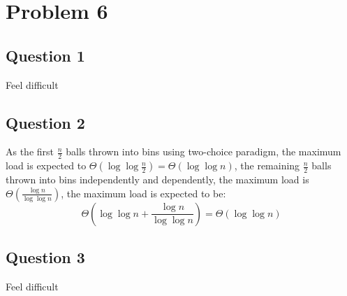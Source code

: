 \documentclass[a4paper, 12pt, titlepage]{article}
\begin{document}
\section{Problem 6}
\subsection{Question 1}
Feel difficult
\subsection{Question 2}
As the first $\frac{n}{2}$ balls thrown into bins using two-choice paradigm, the maximum load is expected to $\Theta \left( \log\log{\frac{n}{2}}\right) = \Theta \left( \log\log{n} \right)$, 
the remaining $\frac{n}{2}$ balls thrown into bins independently and dependently, the maximum load is $\Theta \left( \frac{\log{n}}{\log \log{n}} \right)$, the maximum load is expected to be:
\[
    \Theta \left( \log\log{n} + \frac{\log{n}}{\log \log{n}} \right) = \Theta \left( \log\log{n} \right)
\] 
\subsection{Question 3}
Feel difficult
\end{document}
